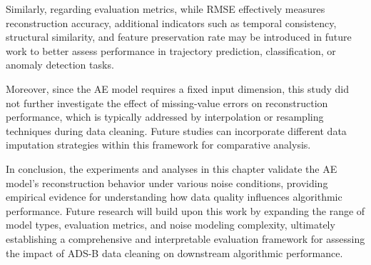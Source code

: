 Similarly, regarding evaluation metrics, while RMSE effectively measures reconstruction accuracy, additional indicators such as temporal consistency, structural similarity, and feature preservation rate may be introduced in future work to better assess performance in trajectory prediction, classification, or anomaly detection tasks.

Moreover, since the AE model requires a fixed input dimension, this study did not further investigate the effect of missing-value errors on reconstruction performance, which is typically addressed by interpolation or resampling techniques during data cleaning. Future studies can incorporate different data imputation strategies within this framework for comparative analysis.

In conclusion, the experiments and analyses in this chapter validate the AE model’s reconstruction behavior under various noise conditions, providing empirical evidence for understanding how data quality influences algorithmic performance.
Future research will build upon this work by expanding the range of model types, evaluation metrics, and noise modeling complexity, ultimately establishing a comprehensive and interpretable evaluation framework for assessing the impact of ADS-B data cleaning on downstream algorithmic performance.